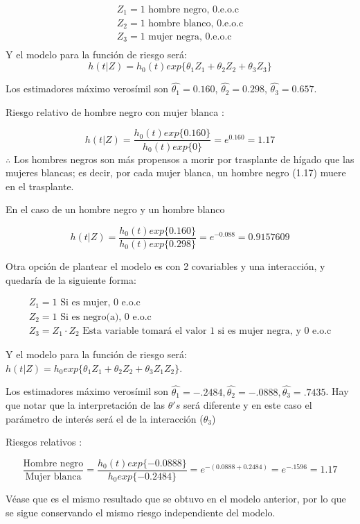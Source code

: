\documentclass[
  a4paper,
  oneside,
  openany]{book}
\begin{document}
\[
\begin{array}{ll}
Z_1 = 1 \mbox{ hombre negro, 0.e.o.c}\\
Z_2 = 1 \mbox{ hombre blanco, 0.e.o.c}\\
Z_3 = 1 \mbox{ mujer negra, 0.e.o.c}\\
\end{array}
\]
Y el modelo para la función de riesgo será:
\[h(t|Z) = h_0(t)exp \{ \theta_1Z_1 + \theta_2Z_2 + \theta_3Z_3\}\]

Los estimadores máximo verosímil son \(\hat{\theta_1} = 0.160\), \(\hat{\theta_2} = 0.298\), \(\hat{\theta_3} = 0.657\).

Riesgo relativo de hombre negro con mujer blanca :

\[h(t|Z) = \frac{h_0(t)exp\{0.160\}}{h_0(t)exp\{0\}} = e^{0.160} = 1.17\]
\(\therefore\) Los hombres negros son más propensos a morir por trasplante de hígado que las mujeres blancas; es decir, por cada mujer blanca, un hombre negro (1.17) muere en el trasplante.

En el caso de un hombre negro y un hombre blanco

\[h(t|Z) = \frac{h_0(t)exp\{0.160\}}{h_0(t)exp\{0.298\}} = e^{-0.088} = 0.9157609\]

Otra opción de plantear el modelo es con 2 covariables y una interacción, y quedaría de la siguiente forma:

\[
\begin{array}{ll}
Z_1 = 1 \mbox{ Si es mujer, 0  e.o.c}\\
Z_2 = 1 \mbox{ Si es negro(a), 0  e.o.c}\\
Z_3 = Z_1\cdot Z_2 \mbox{ Esta variable tomará el valor 1 si es mujer negra, y 0  e.o.c}
\end{array}
\]

Y el modelo para la función de riesgo será: \(h(t|Z) = h_0exp\{\theta_1Z_1+\theta_2Z_2+\theta_3Z_1Z_2\}\).

Los estimadores máximo verosímil son
\(\hat{\theta_1} = -.2484, \hat{\theta_2} =-.0888, \hat{\theta_3} = .7435\).
Hay que notar que la interpretación de las \(\theta's\) será diferente y en este caso el parámetro de interés será el de la interacción (\(\theta_3\))

Riesgos relativos :

\[\frac{\mbox{Hombre negro}}{\mbox{Mujer blanca}} = \frac{h_0(t)exp\{-0.0888\}}{h_0exp\{-0.2484\}} = e^{-(0.0888+0.2484)} = e^{-.1596} = 1.17\]

Véase que es el mismo resultado que se obtuvo en el modelo anterior, por lo que se sigue conservando el mismo riesgo independiente del modelo.
\end{document}
